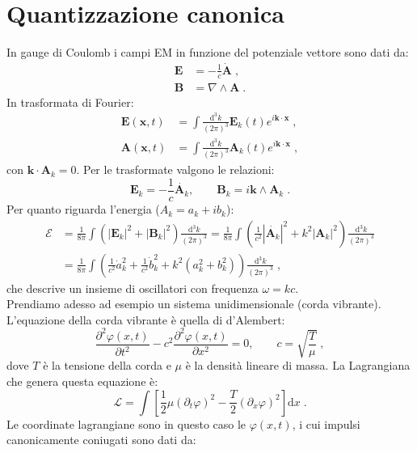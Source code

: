 \documentclass[12pt,a4paper]{report}
\theoremstyle{definition}
\newcommand{\pdev}[3][]{\frac{\partial^{#1} #2}{\partial #3^{#1}}}
\newcommand{\lag}{\mathcal{L}}
\numberwithin{equation}{section}
\newcommand{\diff}[1][]{\mathrm{d}#1}
\begin{document}
\section{Quantizzazione canonica}
In gauge di Coulomb i campi EM in funzione del potenziale vettore sono dati da:
\begin{align*}
\mathbf{E}&=-\frac{1}{c}\dot{\mathbf{A}}\;, \\
\mathbf{B}&=\nabla\wedge\mathbf{A}\;.
\end{align*}
In trasformata di Fourier:
\begin{align}
\mathbf{E}(\mathbf{x},t) &=\int \frac{\diff^3{k}}{(2\pi)^3}\mathbf{E}_k(t)e^{i\mathbf{k}\cdot\mathbf{x}}\;, \\
\mathbf{A}(\mathbf{x},t) &=\int \frac{\diff^3{k}}{(2\pi)^3}\mathbf{A}_k(t)e^{i\mathbf{k}\cdot\mathbf{x}}\;,
\end{align}
con $\mathbf{k}\cdot\mathbf{A}_k=0$. Per le trasformate valgono le relazioni:
\begin{equation}
\mathbf{E}_k=-\frac{1}{c}\dot{\mathbf{A}_k},\qquad \mathbf{B}_k=i\mathbf{k}\wedge\mathbf{A}_k\;.
\end{equation}
Per quanto riguarda l'energia ($A_k=a_k+ib_k$):
\begin{align}
\mathcal{E} &= \frac{1}{8\pi}\int(|\mathbf{E}_k|^2+|\mathbf{B}_k|^2)\frac{\diff^3{k}}{(2\pi)^3}=\frac{1}{8\pi}\int\left(\frac{1}{c^2}|\dot{\mathbf{A}_k}|^2+k^2|\mathbf{A}_k|^2\right)\frac{\diff^3{k}}{(2\pi)^3} \\
&=\frac{1}{8\pi}\int\left(\frac{1}{c^2}\dot{a}_k^2+\frac{1}{c^2}\dot{b}_k^2+k^2(a_k^2+b_k^2)\right)\frac{\diff^3{k}}{(2\pi)^3}\;,
\end{align}
che descrive un insieme di oscillatori con frequenza $\omega=kc$. \\
Prendiamo adesso ad esempio un sistema unidimensionale (corda vibrante). L'equazione della corda vibrante è quella di d'Alembert:
\begin{equation}
\pdev[2]{\varphi(x,t)}{t}-c^2\pdev[2]{\varphi(x,t)}{x}=0,\qquad c=\sqrt{\frac{T}{\mu}}\;,
\end{equation}
dove $T$ è la tensione della corda e $\mu$ è la densità lineare di massa. La Lagrangiana che genera questa equazione è:
\begin{equation}
\lag=\int\left[\frac{1}{2}\mu(\partial_t\varphi)^2-\frac{T}{2}(\partial_x\varphi)^2\right]\diff{x}\;.
\end{equation}
Le coordinate lagrangiane sono in questo caso le $\varphi(x,t)$, i cui impulsi canonicamente coniugati sono dati da:
\end{document}
